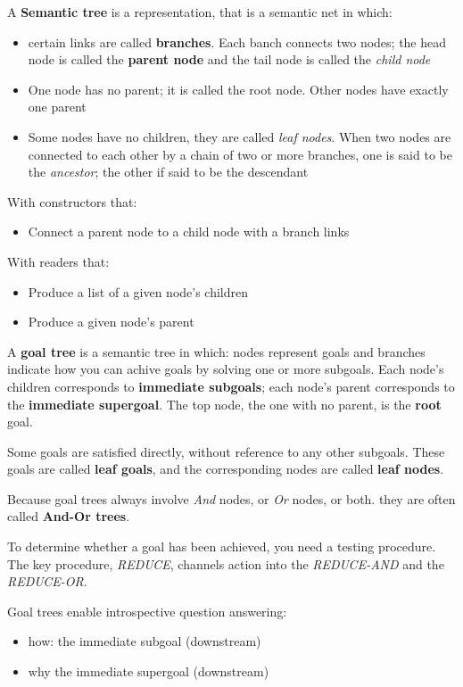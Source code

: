 \documentclass{article}
\begin{document}
A \textbf{Semantic tree} is a representation, that is a semantic net in which:
\begin{itemize}
  \item certain links are called \textbf{branches}. Each banch
    connects two nodes; the head node is called the \textbf{parent
    node} and the tail node is called the \textit{child node}
  \item One node has no parent; it is called the root node.
    Other nodes have exactly one parent
  \item Some nodes have no children, they are called
    \textit{leaf nodes}. When two nodes are connected to each
    other by a chain of two or more branches, one is said to be
    the \textit{ancestor}; the other if said to be the
    descendant
\end{itemize}

With constructors that:
\begin{itemize}
\item Connect a parent node to a child node with a branch links
\end{itemize}
With readers that:
\begin{itemize}
\item Produce a list of a given node's children
\item Produce a given node's parent
\end{itemize}

A \textbf{goal tree} is a semantic tree in which: nodes represent goals and branches indicate how you can achive goals by solving one or more subgoals. Each node's children corresponds to \textbf{immediate subgoals}; each node's parent corresponds to the \textbf{immediate supergoal}. The top node, the one with no parent, is the \textbf{root} goal.

Some goals are satisfied directly, without reference to any other subgoals. These goals are called \textbf{leaf goals}, and the corresponding nodes are called \textbf{leaf nodes}.

Because goal trees always involve \textit{And} nodes, or \textit{Or} nodes, or both. they are often called \textbf{And-Or trees}.

To determine whether a goal has been achieved, you need a testing procedure. The key procedure, \textit{REDUCE}, channels action into the \textit{REDUCE-AND} and the \textit{REDUCE-OR}.

Goal trees enable introspective question answering:
\begin{itemize}
  \item how: the immediate subgoal (downstream) 
  \item why the immediate supergoal (downstream) 
\end{itemize}
\end{document}
